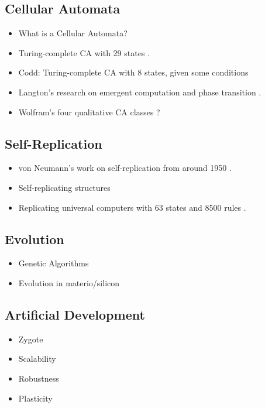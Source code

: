 \subsection{Cellular Automata}

\begin{itemize}
    \item What is a Cellular Automata?
    \item Turing-complete CA with 29 states \cite{neumann1966selfreplication}.
    \item Codd: Turing-complete CA with 8 states, given some conditions \cite{codd1968cellular}
    \item Langton's research on emergent computation and phase transition \cite{langton1990edgeofchaos}.
    \item Wolfram's four qualitative CA classes \cite{wolfram1984complexity}?
\end{itemize}

\subsection{Self-Replication}

\begin{itemize}
    \item von Neumann's work on self-replication from around 1950 \cite{neumann1966selfreplication}.
    \item Self-replicating structures \cite{reggia1998neumann}
    \item Replicating universal computers with 63 states and 8500 rules \cite{perrier1996toward}.
\end{itemize}

\subsection{Evolution}

\begin{itemize}
    \item Genetic Algorithms
    \item Evolution in materio/silicon \cite{miller2014evolution}
\end{itemize}

\subsection{Artificial Development \cite{harding2008artificial}\cite{tufte2008evodevo}}

\begin{itemize}
    \item Zygote
    \item Scalability
    \item Robustness
    \item Plasticity
\end{itemize}

